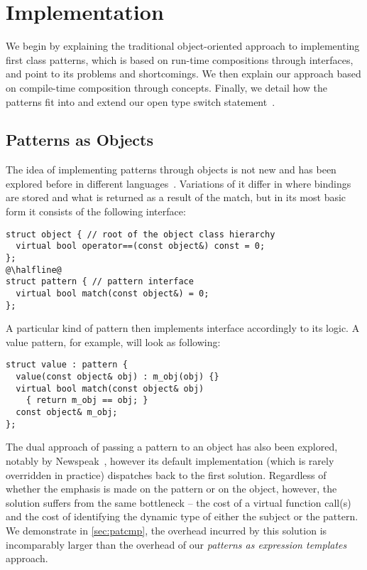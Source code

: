\section{Implementation} %
\label{sec:impl}

We begin by explaining the traditional object-oriented approach to implementing 
first class patterns, which is based on run-time compositions through 
interfaces, and point to its problems and shortcomings. We then explain our 
approach based on compile-time composition through concepts. Finally, we detail 
how the patterns fit into and extend our open type switch statement~\cite{TS12}. 

\subsection{Patterns as Objects}
\label{sec:pao}

The idea of implementing patterns through objects is not new and has been 
explored before in different languages~\cite{Visser06matchingobjects,geller2010pattern,FuncCSharp,Grace2012}.
Variations of it differ in where bindings are stored and what is returned as a 
result of the match, but in its most basic form it consists of the following 
interface:

\begin{lstlisting}[keepspaces,columns=flexible]
struct object { // root of the object class hierarchy
  virtual bool operator==(const object&) const = 0;
};
@\halfline@
struct pattern { // pattern interface
  virtual bool match(const object&) = 0;
};
\end{lstlisting}

\noindent
A particular kind of pattern then implements  interface 
accordingly to its logic. A value pattern, for example, will look as following:

\begin{lstlisting}[keepspaces,columns=flexible]
struct value : pattern {
  value(const object& obj) : m_obj(obj) {}
  virtual bool match(const object& obj) 
    { return m_obj == obj; }
  const object& m_obj;
};
\end{lstlisting}

\noindent
The dual approach of passing a pattern to an object has also been explored, 
notably by Newspeak~\cite{geller2010pattern}, however its default implementation 
(which is rarely overridden in practice) dispatches back to the first solution. 
Regardless of whether the emphasis is made on the pattern or on the object, however,
the solution suffers from the same bottleneck -- the cost of a virtual function 
call(s) and the cost of identifying the dynamic type of either the subject or 
the pattern. We demonstrate in \textsection\ref{sec:patcmp}, the overhead 
incurred by this solution is incomparably larger than the overhead of our 
\emph{patterns as expression templates} approach.

